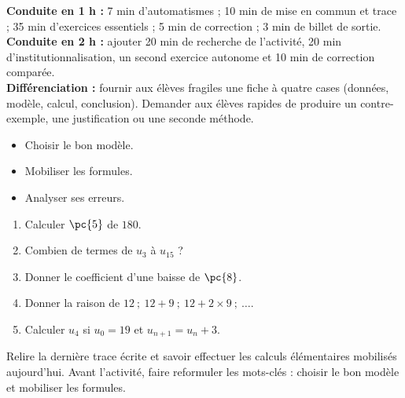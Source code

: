\ifmxteacher
\begin{method}
\textbf{Conduite en 1 h :} 7 min d'automatismes ; 10 min de mise en commun et trace ; 35 min d'exercices essentiels ; 5 min de correction ; 3 min de billet de sortie.\\
\textbf{Conduite en 2 h :} ajouter 20 min de recherche de l'activité, 20 min d'institutionnalisation, un second exercice autonome et 10 min de correction comparée.\\
\textbf{Différenciation :} fournir aux élèves fragiles une fiche à quatre cases (données, modèle, calcul, conclusion). Demander aux élèves rapides de produire un contre-exemple, une justification ou une seconde méthode.
\end{method}
\fi
{}
\begin{objectives}\begin{itemize}\item Choisir le bon modèle.\item Mobiliser les formules.\item Analyser ses erreurs.\end{itemize}\end{objectives}
\begin{fluency}\begin{enumerate}\item Calculer $\pc{5}$ de $180$. \item Combien de termes de $u_3$ à $u_{15}$ ? \item Donner le coefficient d'une baisse de $\pc{8}$. \item Donner la raison de $12\ ;\ 12+9\ ;\ 12+2\times9\ ;\ \ldots$. \item Calculer $u_4$ si $u_0=19$ et $u_{n+1}=u_n+3$. \end{enumerate}\end{fluency}
\begin{prerequisites}Relire la dernière trace écrite et savoir effectuer les calculs élémentaires mobilisés aujourd'hui. Avant l'activité, faire reformuler les mots-clés : choisir le bon modèle et mobiliser les formules.\end{prerequisites}


